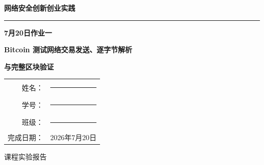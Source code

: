 \documentclass[UTF8,a4paper,zihao=-4]{ctexart}
\begin{document}
\begin{titlepage}
  \centering
  \vspace*{1.8cm}
  {\bfseries 网络安全创新创业实践\par}
  \vspace{0.8cm}
  {\color{navy}\rule{0.78\textwidth}{1.4pt}\par}
  \vspace{1.25cm}
  {\bfseries 7月20日作业一\par}
  \vspace{0.45cm}
  {\bfseries Bitcoin 测试网络交易发送、逐字节解析\par}
  {\bfseries 与完整区块验证\par}
  \vspace{1.8cm}
  \begin{tcolorbox}[width=0.76\textwidth,colback=paper,colframe=navy!65,arc=1mm]
    \centering
    \begin{tabular}{rl}
      姓名：& \rule{7cm}{0.4pt}\\[0.7em]
      学号：& \rule{7cm}{0.4pt}\\[0.7em]
      班级：& \rule{7cm}{0.4pt}\\[0.7em]
      完成日期：& 2026年7月20日
    \end{tabular}
  \end{tcolorbox}
  \vfill
  {\large 课程实验报告\par}
  \vspace{0.8cm}
\end{titlepage}

\begin{abstract}
本作业面向 Bitcoin 测试网络，完成了两笔真实 Testnet4 交易的构造与广播，并从线协议字节出发独立实现交易、区块和 Script 的解析与验证。第一笔交易花费 5 个锁定为 \texttt{P2WSH(SHA256(OP\_TRUE))} 的公开教学输出，将 \num{1650} sat 合并为课程钱包的 \num{1000} sat 输出；第二笔交易由课程专用私钥按 BIP143 构造签名原像，使用 RFC6979 确定性 nonce 和 low-S ECDSA 签名，将 \num{400} sat 发往接收地址，并产生 \num{318} sat 找零。两个广播交易的 txid 分别为 \texttt{4aa330ae...25f7a} 和 \texttt{ad00f80a...9ac105}。

实现未调用第三方 Bitcoin 解析库，而是使用 Python 标准库完成 CompactSize、大小端转换、SegWit 序列化、txid/wtxid、Merkle 树、紧凑难度目标、secp256k1 点运算、DER 签名和 P2WPKH/P2WSH Script 审计。课程签名交易的 \num{223} 个字节以及包含父交易的已确认完整区块的 \num{4045} 个字节均被逐字节映射到唯一协议字段；ECDSA、CleanStack、Merkle 根和 PoW 独立重算全部通过。父交易已在高度 \num{144878} 确认，子交易在最终采样时仍为 mempool 未确认状态。另以一笔已确认默认 Signet P2WPKH 交易和其 \num{74123} 字节区块作为回归样本。报告给出题目原文、理论、完整计算、运行结果、图形证据、测试和全部源代码。

\noindent\textbf{关键词：}Bitcoin；Testnet4；SegWit；P2WPKH；P2WSH；BIP143；ECDSA；Merkle 树；逐字节解析
\end{abstract}
\end{document}
